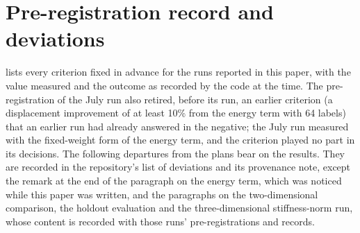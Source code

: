 \section{Pre-registration record and deviations}\label{app:prereg}
\setcounter{table}{0}\setcounter{figure}{0}\setcounter{equation}{0}



 lists every criterion fixed in advance for the runs reported in this
paper, with the value measured and the outcome as recorded by the code at the time. The
pre-registration of the July run also retired, before its run, an earlier criterion (a
displacement improvement of at least 10\% from the energy term with 64 labels) that an
earlier run had already answered in the negative; the July run measured \numGOneRetired{}
with the fixed-weight form of the energy term, and the criterion played no part in its
decisions. The following departures from the plans bear on the results. They are recorded
in the repository's list of deviations and its provenance note, except the remark at the
end of the paragraph on the energy term, which was noticed while this paper was written,
and the paragraphs on the two-dimensional comparison, the holdout evaluation and the
three-dimensional stiffness-norm run, whose content is recorded with those runs'
pre-registrations and records.

